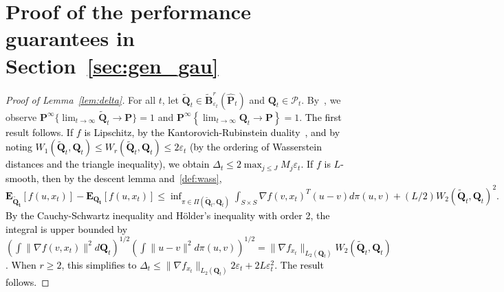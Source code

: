 \documentclass[12pt]{article}
\newcommand{\prob}{{\mathbf P}}
\newcommand{\unc}{u}
\newcommand{\epsnom}{\varepsilon}
\newcommand{\RC}[1]{\textcolor{black}{#1}}
\newcommand{\RC}[1]{\textcolor{blue}{#1}}
\begin{document}
\section{Proof of the performance guarantees in Section~\ref{sec:gen_gau}}
\fi
\label{app:gen_proofs}
\begin{proof}[Proof of Lemma~\ref{lem:delta}]
    For all $t$, let $\tilde{\mathbf{Q}}_t \in  \tilde{\mathbf{B}}_{\epsnom_t}^{r}(\hat{\prob}_t)$ and $\mathbf{Q}_t \in  \mathcal{P}_t$. By~\cite[Lemma 3.7]{mohajerin2018data}, we observe {$\prob^{\infty}\{ \lim_{t\to\infty}\tilde{\mathbf{Q}}_t \rightarrow  \prob\}=1$} and $\prob^{\infty}\left\{ \lim_{t\to\infty}\mathbf{Q}_t \rightarrow \prob \right \}=1$. \RC{The first result follows. 
    If $f$ is Lipschitz, by the Kantorovich-Rubinstein duality~\cite{kantorovich_duality}, and by noting $W_1(\tilde{\mathbf{Q}}_t,\mathbf{Q}_t)\leq W_r(\tilde{\mathbf{Q}}_t,\mathbf{Q}_t) \leq 2\epsnom_{t}$ (by the ordering of Wasserstein distances and the triangle inequality), we obtain $\Delta_t\leq 2\max_{j\leq J}M_j \epsnom_{t}$.}
    \RC{If $f$ is $L$-smooth, then by the descent lemma and~\eqref{def:wass}, 
    $\mathbf{E}_{\mathbf{\tilde{Q}_t}}[f(\unc, x_{t})] - \mathbf{E}_{\mathbf{{Q}_t}}[f(\unc, x_{t})] \leq \inf_{\pi \in \Pi(\tilde{\mathbf{Q}}_t,\mathbf{Q}_t)}\int_{S\times S} \nabla f(v,x_t)^T(u-v)d\pi(u,v) + (L/2)W_2(\tilde{\mathbf{Q}}_t,\mathbf{Q}_t)^2.$ By the Cauchy-Schwartz inequality and H\"{o}lder's inequality with order 2, the integral is upper bounded by $(\textstyle \int \|\nabla f(v,x_t)\|^2d{\mathbf{Q}}_t)^{1/2} (\int \|u-v\|^2d\pi(u,v))^{1/2} = \|\nabla f_{x_t}\|_{L_2({\mathbf{Q}}_t)}W_2(\tilde{\mathbf{Q}}_t,\mathbf{Q}_t)$. When $r\geq 2$, this simplifies to $\Delta_t \leq \|\nabla f_{x_t}\|_{L_2({\mathbf{Q}}_t)}2\epsnom_t + 2L\epsnom_t^2$. The result follows.}
\end{proof}
\end{document}
